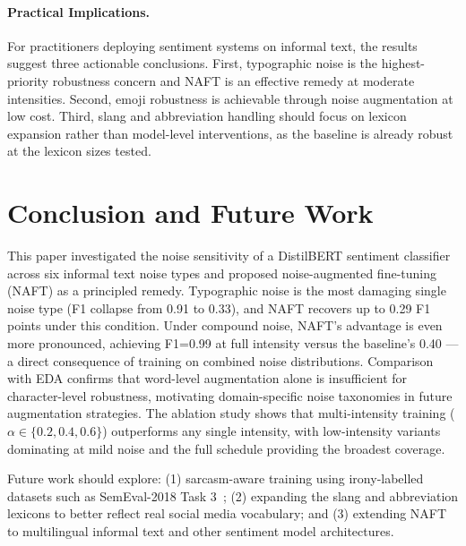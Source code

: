 \documentclass[sigconf]{acmart}
\begin{document}
\paragraph{Practical Implications.}
For practitioners deploying sentiment systems on informal text,
the results suggest three actionable conclusions.
First, typographic noise is the highest-priority robustness concern
and NAFT is an effective remedy at moderate intensities.
Second, emoji robustness is achievable through noise augmentation
at low cost.
Third, slang and abbreviation handling should focus on lexicon
expansion rather than model-level interventions, as the baseline
is already robust at the lexicon sizes tested.

\section{Conclusion and Future Work}

This paper investigated the noise sensitivity of a DistilBERT
sentiment classifier across six informal text noise types and
proposed noise-augmented fine-tuning (NAFT) as a principled remedy.
Typographic noise is the most damaging single noise type (F1
collapse from 0.91 to 0.33), and NAFT recovers up to 0.29 F1
points under this condition.
Under compound noise, NAFT's advantage is even more pronounced,
achieving F1=0.99 at full intensity versus the baseline's 0.40 —
a direct consequence of training on combined noise distributions.
Comparison with EDA confirms that word-level augmentation alone is
insufficient for character-level robustness, motivating
domain-specific noise taxonomies in future augmentation strategies.
The ablation study shows that multi-intensity training
($\alpha \in \{0.2, 0.4, 0.6\}$) outperforms any single intensity,
with low-intensity variants dominating at mild noise and the full
schedule providing the broadest coverage.

Future work should explore: (1) sarcasm-aware training using
irony-labelled datasets such as SemEval-2018 Task
3~\cite{van2018semeval}; (2) expanding the slang and abbreviation
lexicons to better reflect real social media vocabulary; and (3)
extending NAFT to multilingual informal text and other sentiment
model architectures.



\end{document}
